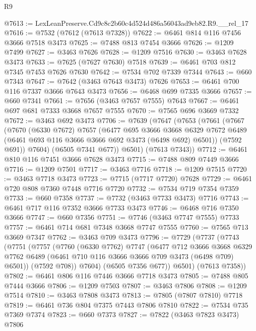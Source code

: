 \begin{lexlean}{R9}
\begin{coremodule}
@7613 := LexLeanPreserve.Cd9c8c2b60c4d524d486a56043ad9eb82.R9.__rel_17
@7616 := @7532 (@7612 (@7613 @7328))
@7622 := @6461 @814 @116 @7456 @3666 @7518 @3473
@7625 := @7488 @813 @7454 @3666
@7626 := @1209 @7499
@7627 := @3463 @7626
@7628 := @1209 @7516
@7630 := @3463 @7628 @3473
@7633 := @7625 (@7627 @7630) @7518
@7639 := @6461 @703 @812 @7345 @7453 @7626 @7630
@7642 := @7534 @702 @7339 @7344
@7643 := @660 @7343
@7647 := @7642 (@3463 @7643 @3473) @7626
@7653 := @6461 @700 @116 @7337 @3666 @7643 @3473
@7656 := @6468 @699 @7335 @3666
@7657 := @660 @7341
@7661 := @7656 (@3463 @7657 @7555) @7643
@7667 := @6461 @697 @681 @7333 @3668 @7657 @7555
@7670 := @7565 @696 @3669 @7332
@7672 := @3463 @692 @3473
@7706 := @7639
    (@7647
      (@7653
        (@7661
          (@7667
            (@7670
              (@6330 @7672)
              @7657
              (@6477
                @695
                @3666
                @3668
                @6329
                @7672
                @6489
                (@6461 @693 @116 @3666 @3666 @692 @3473 (@6498 @692) @6501))
              (@7592 @691))
            @7604)
          (@6505 @7341 @677))
        @6501)
      (@7613 @7343))
@7712 := @6461 @810 @116 @7451 @3666 @7628 @3473
@7715 := @7488 @809 @7449 @3666
@7716 := @1209 @7501
@7717 := @3463 @7716
@7718 := @1209 @7515
@7720 := @3463 @7718 @3473
@7723 := @7715 (@7717 @7720) @7628
@7729 := @6461 @720 @808 @7360 @7448 @7716 @7720
@7732 := @7534 @719 @7354 @7359
@7733 := @660 @7358
@7737 := @7732 (@3463 @7733 @3473) @7716
@7743 := @6461 @717 @116 @7352 @3666 @7733 @3473
@7746 := @6468 @716 @7350 @3666
@7747 := @660 @7356
@7751 := @7746 (@3463 @7747 @7555) @7733
@7757 := @6461 @714 @681 @7348 @3668 @7747 @7555
@7760 := @7565 @713 @3669 @7347
@7762 := @3463 @709 @3473
@7796 := @7729
    (@7737
      (@7743
        (@7751
          (@7757
            (@7760
              (@6330 @7762)
              @7747
              (@6477
                @712
                @3666
                @3668
                @6329
                @7762
                @6489
                (@6461 @710 @116 @3666 @3666 @709 @3473 (@6498 @709) @6501))
              (@7592 @708))
            @7604)
          (@6505 @7356 @677))
        @6501)
      (@7613 @7358))
@7802 := @6461 @806 @116 @7446 @3666 @7718 @3473
@7805 := @7488 @805 @7444 @3666
@7806 := @1209 @7503
@7807 := @3463 @7806
@7808 := @1209 @7514
@7810 := @3463 @7808 @3473
@7813 := @7805 (@7807 @7810) @7718
@7819 := @6461 @736 @804 @7375 @7443 @7806 @7810
@7822 := @7534 @735 @7369 @7374
@7823 := @660 @7373
@7827 := @7822 (@3463 @7823 @3473) @7806

\end{coremodule}
\end{lexlean}
